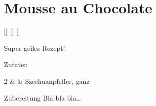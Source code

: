 \section{Mousse au Chocolate}\label{rcp:mousse-au-chocolate}

\begin{recipeintro}
  []
  []
  []

  Super geiles Rezept!
\end{recipeintro}

\begin{ingredients}
  {Zutaten}

  2                &  \si{\tl}           &  Szechuanpfeffer, ganz  \\


\end{ingredients}

\vspace{0.5cm}

\begin{recipestep}
  {Zubereitung}
  Bla bla bla\ldots
\end{recipestep}
